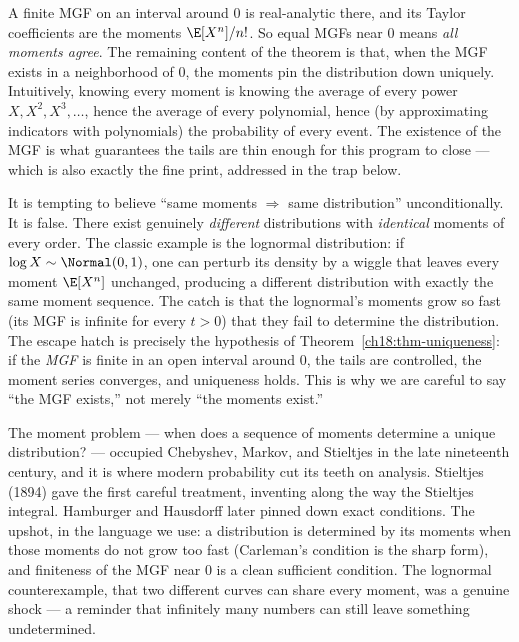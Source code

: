 \begin{whybox}
A finite MGF on an interval around $0$ is real-analytic there, and its Taylor
coefficients are the moments $\E[X^n]/n!$. So equal MGFs near $0$ means
\emph{all moments agree}. The remaining content of the theorem is that, when the
MGF exists in a neighborhood of $0$, the moments pin the distribution down
uniquely. Intuitively, knowing every moment is knowing the average of every
power $X,X^2,X^3,\dots$, hence the average of every polynomial, hence
(by approximating indicators with polynomials) the probability of every event.
The existence of the MGF is what guarantees the tails are thin enough for this
program to close --- which is also exactly the fine print, addressed in the
trap below.
\end{whybox}

\begin{trapbox}
\label{ch18:trap-moments}
It is tempting to believe ``same moments $\Rightarrow$ same distribution''
unconditionally. It is false. There exist genuinely \emph{different}
distributions with \emph{identical} moments of every order. The classic example
is the lognormal distribution: if $\log X\sim\Normal(0,1)$, one can perturb its
density by a wiggle that leaves every moment $\E[X^n]$ unchanged, producing a
different distribution with exactly the same moment sequence. The catch is that
the lognormal's moments grow so fast (its MGF is infinite for every $t>0$) that
they fail to determine the distribution. The escape hatch is precisely the
hypothesis of Theorem~\ref{ch18:thm-uniqueness}: if the \emph{MGF} is finite in
an open interval around $0$, the tails are controlled, the moment series
converges, and uniqueness holds. This is why we are careful to say ``the MGF
exists,'' not merely ``the moments exist.''
\end{trapbox}

\begin{historybox}
The moment problem --- when does a sequence of moments determine a unique
distribution? --- occupied Chebyshev, Markov, and Stieltjes in the late
nineteenth century, and it is where modern probability cut its teeth on
analysis. Stieltjes (1894) gave the first careful treatment, inventing along the
way the Stieltjes integral. Hamburger and Hausdorff later pinned down exact
conditions. The upshot, in the language we use: a distribution is determined by
its moments when those moments do not grow too fast (Carleman's condition is the
sharp form), and finiteness of the MGF near $0$ is a clean sufficient condition.
The lognormal counterexample, that two different curves can share every moment,
was a genuine shock --- a reminder that infinitely many numbers can still leave
something undetermined.
\end{historybox}

